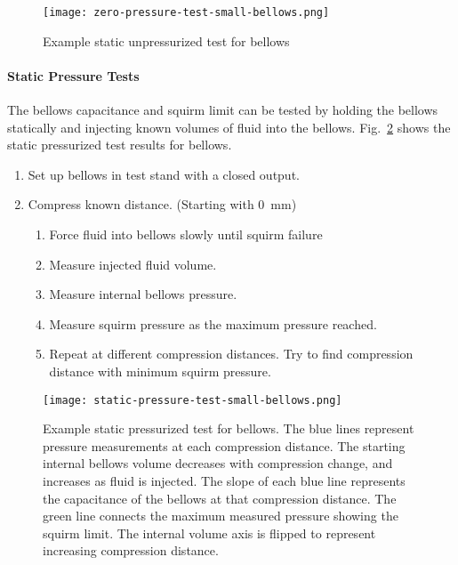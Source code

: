 \begin{figure}
\hypertarget{ch1:fig:zero-pressure-small}{%
\centering
\texttt{[image: zero-pressure-test-small-bellows.png]}
\caption{Example static unpressurized test for
bellows}\label{ch1:fig:zero-pressure-small}
}
\end{figure}

\hypertarget{ch1:static-pressure-tests}{%
\paragraph{Static Pressure Tests}\label{ch1:static-pressure-tests}}

The bellows capacitance and squirm limit can be tested by holding the
bellows statically and injecting known volumes of fluid into the
bellows.
Fig.~\ref{ch1:fig:static-pressure-small} shows the static pressurized test
results for bellows.

\begin{enumerate}
\def\labelenumi{\arabic{enumi}.}
\tightlist
\item
  Set up bellows in test stand with a closed output.
\item
  Compress known distance. (Starting with \SI{0}{\mm})

  \begin{enumerate}
  \def\labelenumii{\arabic{enumii}.}
  \tightlist
  \item
    Force fluid into bellows slowly until squirm failure
  \item
    Measure injected fluid volume.
  \item
    Measure internal bellows pressure.
  \item
    Measure squirm pressure as the maximum pressure reached.
  \item
    Repeat at different compression distances. Try to find compression distance
    with minimum squirm pressure.
  \end{enumerate}
\end{enumerate}

\begin{figure}
\hypertarget{ch1:fig:static-pressure-small}{%
\centering
\texttt{[image: static-pressure-test-small-bellows.png]}
\caption{Example static pressurized test for bellows. The blue lines
represent pressure measurements at each compression distance. The
starting internal bellows volume decreases with compression change, and
increases as fluid is injected. The slope of each blue line represents
the capacitance of the bellows at that compression distance. The green
line connects the maximum measured pressure showing the squirm limit.
The internal volume axis is flipped to represent increasing compression
distance.}\label{ch1:fig:static-pressure-small}
}
\end{figure}


